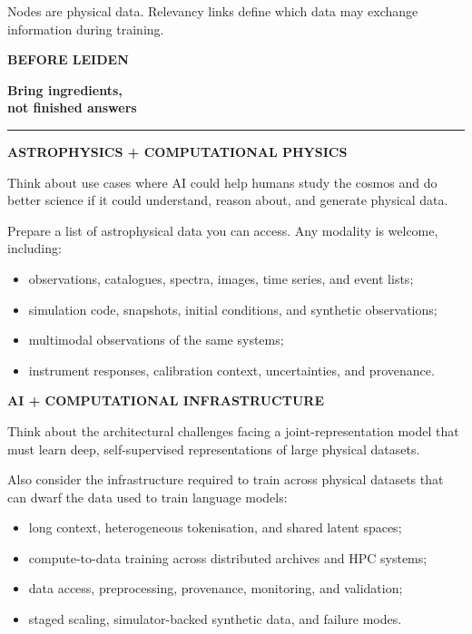 \documentclass[9pt,a5paper,twoside]{extarticle}
\newcommand{\eyebrow}[1]{%
  {\small\bfseries\color{Sky}\MakeUppercase{#1}}\par\vspace{2mm}}
\newcommand{\pagetitle}[2]{%
  \eyebrow{#1}%
  {\fontsize{20}{22}\selectfont\bfseries\color{Night}#2\par}%
  \vspace{3mm}%
  {\color{Gold}\rule{18mm}{1.4pt}}\par\vspace{4mm}}
\begin{document}
\vfill
{\small\color{Muted}Nodes are physical data. Relevancy links define which data may exchange information during training.}
\newpage

\pagetitle{Before Leiden}{Bring ingredients,\\not finished answers}

\begin{tcolorbox}[enhanced,colback=DeepBlue,colframe=DeepBlue,coltext=white,boxrule=0pt,arc=2mm,left=5mm,right=5mm,top=4.5mm,bottom=4.5mm]
  {\large\bfseries\color{Gold}ASTROPHYSICS + COMPUTATIONAL PHYSICS}\par\vspace{2mm}
  Think about use cases where AI could help humans study the cosmos and do better science if it could understand, reason about, and generate physical data.

  Prepare a list of astrophysical data you can access. Any modality is welcome, including:
  \begin{itemize}[label=\textcolor{Aqua}{\textbullet}]
    \item observations, catalogues, spectra, images, time series, and event lists;
    \item simulation code, snapshots, initial conditions, and synthetic observations;
    \item multimodal observations of the same systems;
    \item instrument responses, calibration context, uncertainties, and provenance.
  \end{itemize}
\end{tcolorbox}

\vspace{4mm}
\begin{tcolorbox}[enhanced,colback=Mist,colframe=Mist,boxrule=0pt,arc=2mm,left=5mm,right=5mm,top=4.5mm,bottom=4.5mm,borderline west={2.5pt}{0pt}{Gold}]
  {\large\bfseries\color{DeepBlue}AI + COMPUTATIONAL INFRASTRUCTURE}\par\vspace{2mm}
  Think about the architectural challenges facing a joint-representation model that must learn deep, self-supervised representations of large physical datasets.

  Also consider the infrastructure required to train across physical datasets that can dwarf the data used to train language models:
  \begin{itemize}[label=\textcolor{Sky}{\textbullet}]
    \item long context, heterogeneous tokenisation, and shared latent spaces;
    \item compute-to-data training across distributed archives and HPC systems;
    \item data access, preprocessing, provenance, monitoring, and validation;
    \item staged scaling, simulator-backed synthetic data, and failure modes.
  \end{itemize}
\end{tcolorbox}
\end{document}
